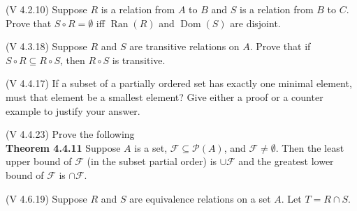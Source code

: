 \documentclass[fleqn,addpoints,12pt]{exam}
\newif\ifanswers
\theoremstyle{remark}
\newcommand{\Ran}{\ensuremath{\operatorname{Ran}}}
\newcommand{\Dom}{\ensuremath{\operatorname{Dom}}}
\newcommand{\sF}{\ensuremath{\mathcal{F}}}
\newcommand{\sP}{\ensuremath{\mathcal{P}}}
\begin{document}
\begin{questions}
\bigskip

  \question (V 4.2.10) %
  Suppose $R$ is a relation from $A$ to $B$ and $S$ is a relation from $B$ to $C$.
  Prove that $S \circ R = \emptyset$ iff $\Ran(R)$ and $\Dom(S)$ are disjoint.

  \medskip

  \begin{solution}  \end{solution}

  \bigskip
  \question (V 4.3.18)
  Suppose $R$ and $S$ are transitive relations on $A$. Prove that if 
  $S \circ R \subseteq R\circ S$, then $R\circ S$ is transitive.
  \medskip
  \begin{solution}  \end{solution}

  \bigskip

  \question (V 4.4.17)  %
  If a subset of a partially ordered set has exactly one minimal element,
  must that element be a smallest element? Give either a proof or a counter
  example to justify your answer.
  \medskip
  \begin{solution}  \end{solution}

  \bigskip

  \question (V 4.4.23)
  Prove the following \\[4pt]
  {\bf Theorem 4.4.11}
    Suppose $A$ is a set, $\sF \subseteq \sP(A)$, and $\sF \neq \emptyset$. 
    Then the least upper bound of $\sF$ (in the subset partial order) is 
    $\cup \sF$ and the greatest lower bound of  $\sF$ is  $\cap \sF$.
  \medskip
  \begin{solution}  \end{solution}

  \bigskip

  \question (V 4.6.19)  %
  Suppose $R$ and $S$ are equivalence relations on a set $A$. Let 
  $T = R\cap S$.
  \begin{parts}

\end{parts}
\end{questions}
\end{document}
